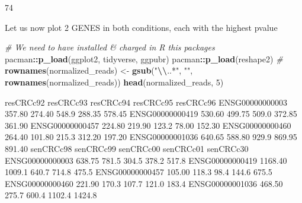 \documentclass[
]{article}
\newenvironment{Shaded}{\begin{snugshade}}{\end{snugshade}}
\newcommand{\CommentTok}[1]{\textcolor[rgb]{0.56,0.35,0.01}{\textit{#1}}}
\newcommand{\DecValTok}[1]{\textcolor[rgb]{0.00,0.00,0.81}{#1}}
\newcommand{\FunctionTok}[1]{\textcolor[rgb]{0.13,0.29,0.53}{\textbf{#1}}}
\newcommand{\NormalTok}[1]{#1}
\newcommand{\OtherTok}[1]{\textcolor[rgb]{0.56,0.35,0.01}{#1}}
\newcommand{\SpecialCharTok}[1]{\textcolor[rgb]{0.81,0.36,0.00}{\textbf{#1}}}
\newcommand{\StringTok}[1]{\textcolor[rgb]{0.31,0.60,0.02}{#1}}
\begin{document}
\begin{Shaded}
\begin{Highlighting}[]
\NormalTok{[1] 74}
\end{Highlighting}
\end{Shaded}

Let us now plot 2 GENES in both conditions, each with the highest pvalue

\begin{Shaded}
\begin{Highlighting}[]
\CommentTok{\# We need to have installed \& charged in R this packages }
\NormalTok{pacman}\SpecialCharTok{::}\FunctionTok{p\_load}\NormalTok{(ggplot2, tidyverse, ggpubr)}
\NormalTok{pacman}\SpecialCharTok{::}\FunctionTok{p\_load}\NormalTok{(reshape2)}
\CommentTok{\#}
\FunctionTok{rownames}\NormalTok{(normalized\_reads) }\OtherTok{\textless{}{-}} \FunctionTok{gsub}\NormalTok{(}\StringTok{"}\SpecialCharTok{\textbackslash{}\textbackslash{}}\StringTok{..*"}\NormalTok{, }\StringTok{""}\NormalTok{, }\FunctionTok{rownames}\NormalTok{(normalized\_reads))}
\FunctionTok{head}\NormalTok{(normalized\_reads, }\DecValTok{5}\NormalTok{)}
\end{Highlighting}
\end{Shaded}

\begin{Shaded}
\begin{Highlighting}[]
\NormalTok{                resCRCc92 resCRCc93 resCRCc94 resCRCc95 resCRCc96}
\NormalTok{ENSG00000000003    357.80    274.40     548.9    288.35    578.45}
\NormalTok{ENSG00000000419    530.60    499.75     509.0    372.85    361.90}
\NormalTok{ENSG00000000457    224.80    219.90     123.2     78.00    152.30}
\NormalTok{ENSG00000000460    264.40    101.80     215.3    312.20    197.20}
\NormalTok{ENSG00000001036    640.65    588.80     929.9    869.95    891.40}
\NormalTok{                senCRCc98 senCRCc99 senCRCc00 senCRCc01 senCRCc30}
\NormalTok{ENSG00000000003    638.75     781.5     304.5     378.2     517.8}
\NormalTok{ENSG00000000419   1168.40    1009.1     640.7     714.8     475.5}
\NormalTok{ENSG00000000457    105.00     118.3      98.4     144.6     675.5}
\NormalTok{ENSG00000000460    221.90     170.3     107.7     121.0     183.4}
\NormalTok{ENSG00000001036    468.50     275.7     600.4    1102.4    1424.8}
\end{Highlighting}
\end{Shaded}
\end{document}
